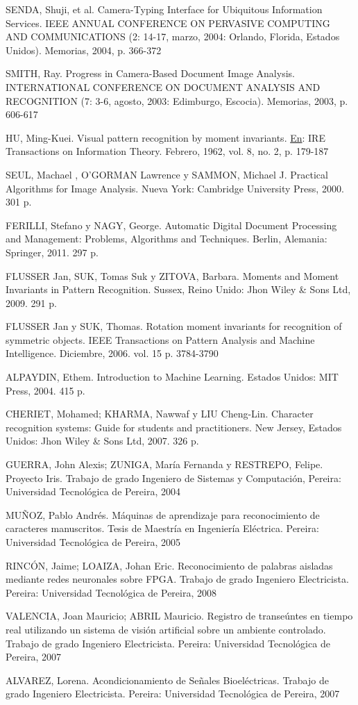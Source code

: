 \documentclass[a4paper, 11pt, oneside]{report}
\begin{document}
	SENDA, Shuji, et al. Camera-Typing Interface for Ubiquitous Information Services. IEEE ANNUAL CONFERENCE ON PERVASIVE COMPUTING AND COMMUNICATIONS (2: 14-17, marzo, 2004: Orlando, Florida, Estados Unidos). Memorias, 2004, p. 366-372
	
	SMITH, Ray. Progress in Camera-Based Document Image Analysis. INTERNATIONAL CONFERENCE ON DOCUMENT ANALYSIS AND RECOGNITION (7: 3-6, agosto, 2003: Edimburgo, Escocia). Memorias, 2003, p. 606-617
	
	HU, Ming-Kuei. Visual pattern recognition by moment invariants. \underline{En}: IRE Transactions on Information Theory. Febrero, 1962, vol. 8, no. 2, p. 179-187
	
	SEUL, Machael , O'GORMAN Lawrence y SAMMON, Michael J. Practical Algorithms for Image Analysis. Nueva York: Cambridge University Press, 2000. 301 p.
	
	FERILLI, Stefano y NAGY, George. Automatic Digital Document Processing and Management: Problems, Algorithms and Techniques. Berlin, Alemania: Springer, 2011. 297 p.
	
	FLUSSER Jan, SUK, Tomas Suk y ZITOVA, Barbara. Moments and Moment Invariants in Pattern Recognition. Sussex, Reino Unido: Jhon Wiley \& Sons Ltd, 2009. 291 p.
	
	FLUSSER Jan y SUK, Thomas. Rotation moment invariants for recognition of symmetric objects. IEEE Transactions on Pattern Analysis and Machine Intelligence. Diciembre, 2006. vol. 15 p. 3784-3790
	
	ALPAYDIN, Ethem. Introduction to Machine Learning. Estados Unidos: MIT Press, 2004. 415 p.
	
	CHERIET, Mohamed; KHARMA, Nawwaf y LIU Cheng-Lin. Character recognition systems: Guide for students and practitioners. New Jersey, Estados Unidos: Jhon Wiley \& Sons Ltd, 2007. 326 p.
	
	GUERRA, John Alexis; ZUNIGA, María Fernanda y RESTREPO, Felipe. Proyecto Iris. Trabajo de grado Ingeniero de Sistemas y Computación, Pereira: Universidad Tecnológica de Pereira, 2004
	
	MUÑOZ, Pablo Andrés. Máquinas de aprendizaje para reconocimiento de caracteres manuscritos. Tesis de Maestría en Ingeniería Eléctrica. Pereira: Universidad Tecnológica de Pereira, 2005
	
	RINCÓN, Jaime; LOAIZA, Johan Eric. Reconocimiento de palabras aisladas mediante redes neuronales sobre FPGA. Trabajo de grado Ingeniero Electricista. Pereira: Universidad Tecnológica de Pereira, 2008
	
	VALENCIA, Joan Mauricio; ABRIL Mauricio. Registro de transeúntes en tiempo real utilizando un sistema de visión artificial sobre un ambiente controlado. Trabajo de grado Ingeniero Electricista. Pereira: Universidad Tecnológica de Pereira, 2007
	
	ALVAREZ, Lorena. Acondicionamiento de Señales Bioeléctricas. Trabajo de grado Ingeniero Electricista. Pereira: Universidad Tecnológica de Pereira, 2007
	
\end{document}
